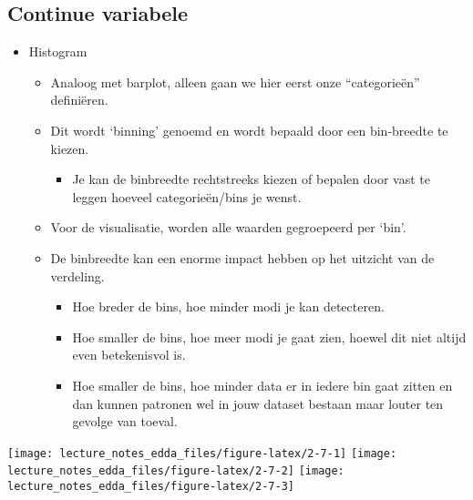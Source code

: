 \documentclass[]{memoir}
\providecommand{\tightlist}{%
  \setlength{\itemsep}{0pt}\setlength{\parskip}{0pt}}
\begin{document}
\subsection{Continue variabele}\label{continue-variabele}

\begin{itemize}
\tightlist
\item
  Histogram

  \begin{itemize}
  \tightlist
  \item
    Analoog met barplot, alleen gaan we hier eerst onze ``categorieën''
    definiëren.
  \item
    Dit wordt `binning' genoemd en wordt bepaald door een bin-breedte te
    kiezen.

    \begin{itemize}
    \tightlist
    \item
      Je kan de binbreedte rechtstreeks kiezen of bepalen door vast te
      leggen hoeveel categorieën/bins je wenst.
    \end{itemize}
  \item
    Voor de visualisatie, worden alle waarden gegroepeerd per `bin'.
  \item
    De binbreedte kan een enorme impact hebben op het uitzicht van de
    verdeling.

    \begin{itemize}
    \tightlist
    \item
      Hoe breder de bins, hoe minder modi je kan detecteren.
    \item
      Hoe smaller de bins, hoe meer modi je gaat zien, hoewel dit niet
      altijd even betekenisvol is.
    \item
      Hoe smaller de bins, hoe minder data er in iedere bin gaat zitten
      en dan kunnen patronen wel in jouw dataset bestaan maar louter ten
      gevolge van toeval.
    \end{itemize}
  \end{itemize}
\end{itemize}

\texttt{[image: lecture\_notes\_edda\_files/figure-latex/2-7-1]}
\texttt{[image: lecture\_notes\_edda\_files/figure-latex/2-7-2]}
\texttt{[image: lecture\_notes\_edda\_files/figure-latex/2-7-3]}
\end{document}

